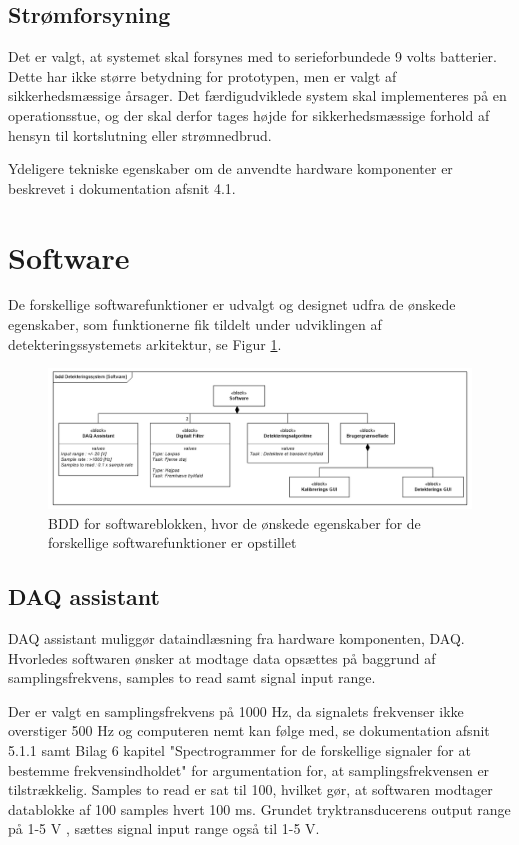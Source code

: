  
\subsection{Strømforsyning}
Det er valgt, at systemet skal forsynes med to serieforbundede 9 volts batterier. Dette har ikke større betydning for prototypen, men er valgt af sikkerhedsmæssige årsager. Det færdigudviklede system skal implementeres på en operationsstue, og der skal derfor tages højde for sikkerhedsmæssige forhold af hensyn til kortslutning eller strømnedbrud. 

Ydeligere tekniske egenskaber om de anvendte hardware komponenter er beskrevet i dokumentation afsnit 4.1. 

\section{Software}\label{softwaredesign}
De forskellige softwarefunktioner er udvalgt og designet udfra de ønskede egenskaber, som funktionerne fik tildelt under udviklingen af detekteringssystemets arkitektur, se Figur \ref{SW_BDD}.

\begin{figure}[H]
	\centering
	\includegraphics[width=1\textwidth]{Figure/SoftwareBDD}
	\caption{BDD for softwareblokken, hvor de ønskede egenskaber for de forskellige softwarefunktioner er opstillet}
    \label{SW_BDD}
\end{figure} 

\subsection{DAQ assistant}
DAQ assistant muliggør dataindlæsning fra hardware komponenten, DAQ. Hvorledes softwaren ønsker at modtage data opsættes på baggrund af samplingsfrekvens, samples to read samt signal input range. 

Der er valgt en samplingsfrekvens på 1000 Hz, da signalets frekvenser ikke overstiger 500 Hz og computeren nemt kan følge med, se dokumentation afsnit 5.1.1 samt Bilag 6 kapitel "Spectrogrammer for de forskellige signaler for at bestemme frekvensindholdet" for argumentation for, at samplingsfrekvensen er tilstrækkelig. Samples to read er sat til 100, hvilket gør, at softwaren modtager datablokke af 100 samples hvert 100 ms. Grundet tryktransducerens output range på 1-5 V \cite{DatabladAKS32}, sættes signal input range også til 1-5 V. 

